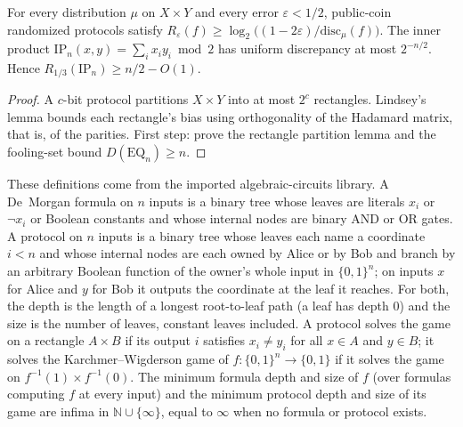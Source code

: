\begin{theorem}
  \label{thm:frontiers-ip-discrepancy}
  \notready
  For every distribution $\mu$ on $X \times Y$ and every error
  $\varepsilon < 1/2$, public-coin randomized protocols satisfy
  $R_\varepsilon(f) \ge \log_2\bigl((1 - 2\varepsilon)/\mathrm{disc}_\mu(f)\bigr)$.
  The inner product $\mathrm{IP}_n(x,y) = \sum_i x_i y_i \bmod 2$ has uniform
  discrepancy at most $2^{-n/2}$. Hence $R_{1/3}(\mathrm{IP}_n) \ge n/2 - O(1)$.
\end{theorem}
\begin{proof}
  A $c$-bit protocol partitions $X \times Y$ into at most $2^c$ rectangles.
  Lindsey's lemma bounds each rectangle's bias using orthogonality of the
  Hadamard matrix, that is, of the parities. First step: prove the rectangle
  partition lemma and the fooling-set bound $D(\mathrm{EQ}_n) \ge n$.
\end{proof}

\begin{definition}
  \label{def:frontiers-kw-protocol}
  \leanok
  These definitions come from the imported algebraic-circuits library. A
  De~Morgan formula on $n$ inputs is a binary tree whose leaves are literals
  $x_i$ or $\lnot x_i$ or Boolean constants and whose internal nodes are
  binary AND or OR gates. A protocol on $n$ inputs is a binary tree whose
  leaves each name a coordinate $i < n$ and whose internal nodes are each
  owned by Alice or by Bob and branch by an arbitrary Boolean function of the
  owner's whole input in $\{0,1\}^n$; on inputs $x$ for Alice and $y$ for Bob
  it outputs the coordinate at the leaf it reaches. For both, the depth is the
  length of a longest root-to-leaf path (a leaf has depth $0$) and the size is
  the number of leaves, constant leaves included. A protocol solves the game on
  a rectangle $A \times B$ if its output $i$ satisfies $x_i \neq y_i$ for all
  $x \in A$ and $y \in B$; it solves the Karchmer--Wigderson game of
  $f : \{0,1\}^n \to \{0,1\}$ if it solves the game on
  $f^{-1}(1) \times f^{-1}(0)$. The minimum formula depth and size of $f$ (over
  formulas computing $f$ at every input) and the minimum protocol depth and size
  of its game are infima in $\mathbb{N} \cup \{\infty\}$, equal to $\infty$ when
  no formula or protocol exists.
\end{definition}

